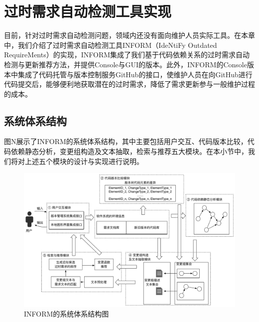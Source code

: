 \chapter{过时需求自动检测工具实现}

目前，针对过时需求自动检测问题，领域内还没有面向维护人员实际工具。在本章中，我们介绍了过时需求自动检测工具INFORM（IdeNtiFy Outdated RequireMents）的实现，INFORM集成了我们基于代码依赖关系的过时需求自动检测与更新推荐方法，并提供Console与GUI的版本。此外，INFORM的Console版本中集成了代码托管与版本控制服务GitHub的接口，使维护人员在向GitHub进行代码提交后，能够便利地获取潜在的过时需求，降低了需求更新参与一般维护过程的成本。

\section{系统体系结构}

图N展示了INFORM的系统体系结构，其中主要包括用户交互、代码版本比较，代码依赖静态分析，变更组构造及文本抽取，检索与推荐五大模块。在本小节中，我们将对上述五个模块的设计与实现进行说明。

\begin{figure}[thb]
    \centering
    \includegraphics[width=1.0\textwidth]{./figures/inform/INFORM_Architecture.pdf}
    \caption{INFORM的系统体系结构图}
    \label{F:INFORM_Architecture}
\end{figure}

